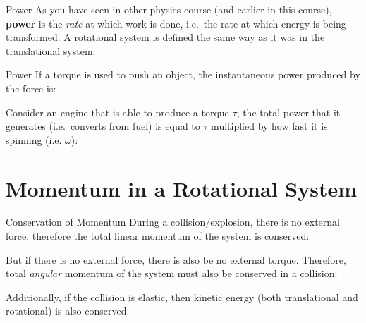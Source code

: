 \documentclass[12pt,compress,aspectratio=169]{beamer}
\begin{document}
\begin{frame}{Power}
  As you have seen in other physics course (and earlier in this course),
  \textbf{power} is the \emph{rate} at which work is done, i.e.\ the rate at
  which energy is being transformed. A rotational system is defined the same
  way as it was in the translational system:
  
\end{frame}



\begin{frame}{Power}
  If a torque is used to push an object, the instantaneous power produced by the
  force is:
  
  
  Consider an engine that is able to produce a torque $\tau$, the total power
  that it generates (i.e.\ converts from fuel) is equal to $\tau$ multiplied
  by how fast it is spinning (i.e. $\omega$):
\end{frame}




\section{Momentum in a Rotational System}

\begin{frame}{Conservation of Momentum}
  During a collision/explosion, there is no external force, therefore the total
  linear momentum of the system is conserved:

  
  \vspace{-.1in}But if there is no external force, there is also be no external
  torque. Therefore, total \emph{angular} momentum of the system must also be
  conserved in a collision:
  

  Additionally, if the collision is elastic, then kinetic energy (both
  translational and rotational) is also conserved.

  
\end{frame}
\end{document}
